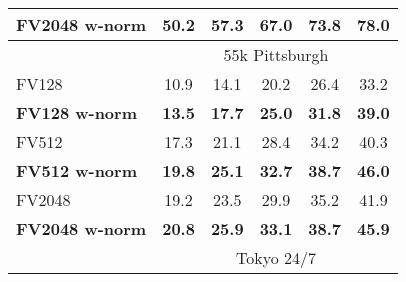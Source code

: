 \begin{tabularx}{0.864\linewidth}{|l|c c c c c|}
	    \textbf{FV2048 w-norm}  & \textbf{50.2} & \textbf{57.3} & \textbf{67.0} & \textbf{73.8} & \textbf{78.0} \\
	    \hline
			\rowcolor{maroon!40}
			\multicolumn{1}{|c}{\quad} & \multicolumn{5}{c|}{55k Pittsburgh} \\
		\hline 
			\rowcolor{maroon!10}
			FV128     & 10.9 & 14.1 & 20.2 & 26.4 & 33.2 \\
			\rowcolor{maroon!10}
			\textbf{FV128 w-norm}  & \textbf{13.5}  &  \textbf{17.7}  &  \textbf{25.0}  &  \textbf{31.8}  &  \textbf{39.0} \\
	    \hline  
	    \rowcolor{maroon!10}
	    FV512   & 17.3 &  21.1 &  28.4 &  34.2 &  40.3 \\      
	    \rowcolor{maroon!10}
	    \rowcolor{maroon!10}
	    \textbf{FV512 w-norm}  & \textbf{19.8} &  \textbf{25.1} &  \textbf{32.7}  & \textbf{38.7} &  \textbf{46.0} \\
	    \hline
		\rowcolor{maroon!10}
		FV2048        & 19.2 & 23.5 & 29.9 &  35.2 &  41.9 \\
		\rowcolor{maroon!10}
        \rowcolor{maroon!10}
        \textbf{FV2048 w-norm}  & \textbf{20.8} & \textbf{25.9} & \textbf{33.1} & \textbf{38.7} & \textbf{45.9} \\
        \hline
			\rowcolor{maroon!40}
			\multicolumn{1}{|c}{\quad} & \multicolumn{5}{c|}{Tokyo 24/7} \\

\end{tabularx}
